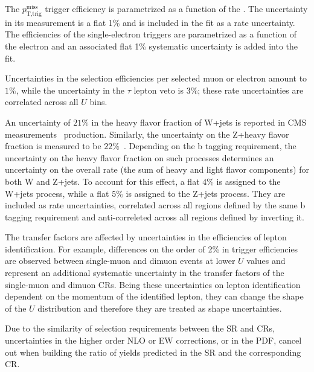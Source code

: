 The $p_\text{T,trig}^\text{miss}$ trigger efficiency is parametrized as a function of the
\MET. The uncertainty in its measurement is a flat 1\% and is included in the fit as a rate uncertainty.
The efficiencies of the single-electron triggers are parametrized as a
function of the electron \pt and an associated flat 1\% systematic uncertainty is added into the fit.

Uncertainties in the selection efficiencies per selected muon or electron amount to $1\%$, while the uncertainty in the $\tau$ lepton veto is $3\%$; these rate uncertainties are correlated across all $U$ bins.

An uncertainty of $21\%$ in the heavy flavor fraction of
W+jets is reported in CMS measurements~\cite{Khachatryan:2014uva,Chatrchyan:2013uza} production. Similarly, the uncertainty on the Z+heavy flavor fraction is measured to be $22\%$~\cite{Khachatryan:2014zya,Chatrchyan:2014dha}. Depending on the b tagging requirement, the uncertainty on the heavy flavor fraction on such processes determines an uncertainty on the overall rate (the sum of heavy and light flavor components) for both W and Z+jets. To account for this effect, a flat $4\%$ is assigned to the W+jets process, while a flat $5\%$ is assigned to the Z+jets process. They are included as rate uncertainties, correlated across all regions defined by the same b tagging requirement and anti-correleted across all regions defined by inverting it.
%
%

The transfer factors are affected by uncertainties in the efficiencies of lepton identification.  For example, differences on the order of 2\% in \MET trigger efficiencies are observed between single-muon and dimuon events at lower $U$ values and represent an additional systematic uncertainty in the transfer factors of the single-muon and dimuon CRs. Being these uncertainties on lepton identification dependent on the momentum of the identified lepton, they can change the shape of the $U$ distribution and therefore they are treated as shape uncertainties.

Due to the similarity of selection requirements between the SR and CRs, uncertainties in the higher order NLO or EW corrections, or in the PDF, cancel out when building the ratio of yields predicted in the SR and the corresponding CR.

